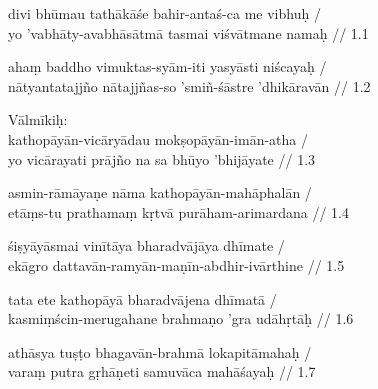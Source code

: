 \documentclass[a4paper,parskip]{scrarticle}
\begin{document}
\begin{otherlanguage}{iast}
  divi bhūmau tathākāśe bahir-antaś-ca me vibhuḥ /\\
  yo 'vabhāty-avabhāsātmā tasmai viśvātmane namaḥ // 1.1

  ahaṃ baddho vimuktas-syām-iti yasyāsti niścayaḥ /\\
  nātyantatajjño nātajjñas-so 'smiñ-śāstre 'dhikāravān // 1.2

  Vālmīkiḥ:\\
  kathopāyān-vicāryādau mokṣopāyān-imān-atha /\\
  yo vicārayati prājño na sa bhūyo 'bhijāyate // 1.3

  asmin-rāmāyaṇe nāma kathopāyān-mahāphalān /\\
  etāṃs-tu prathamaṃ kṛtvā purāham-arimardana // 1.4

  śiṣyāyāsmai vinītāya bharadvājāya dhīmate /\\
  ekāgro dattavān-ramyān-maṇīn-abdhir-ivārthine // 1.5

  tata ete kathopāyā bharadvājena dhīmatā /\\
  kasmiṃścin-merugahane brahmaṇo 'gra udāhṛtāḥ // 1.6

  athāsya tuṣṭo bhagavān-brahmā lokapitāmahaḥ /\\
  varaṃ putra gṛhāṇeti samuvāca mahāśayaḥ // 1.7
\end{otherlanguage}
\end{document}
